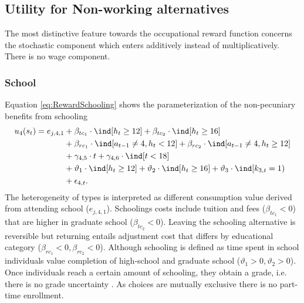 \FloatBarrier\subsection{Utility for Non-working alternatives}
The most distinctive feature towards the occupational reward function concerns the stochastic component which enters additively instead of multiplicatively. There is no wage component.
\FloatBarrier\subsubsection{School}
Equation \ref{eq:RewardSchooling} shows the parameterization of the non-pecuniary benefits from schooling
%
\begin{align}\label{eq:RewardSchooling}
	u_{4}(s_t) = e_{j, 4, 1} & + \beta_{tc_1} \cdot \ind[h_t \geq 12] + \beta_{tc_2} \cdot \ind[h_t \geq 16] 														\nonumber \\
    							  & + \beta_{rc_1} \cdot \ind[a_{t-1} \neq 4, h_t < 12] + \beta_{rc_2} \cdot \ind[a_{t-1} \neq 4, h_t \geq 12] 			   \nonumber \\
    							  & + \gamma_{4,5} \cdot t + \gamma_{4,6} \cdot \ind[t < 18] 																					  \nonumber \\
     							  & + \vartheta_1 \cdot \ind[h_t \geq 12] + \vartheta_2 \cdot \ind[h_t \geq 16] + \vartheta_3 \cdot \ind[k_{3,t} = 1) \nonumber \\
      							  & + \epsilon_{4,t}.
\end{align}
%
The heterogeneity of types is interpreted as different consumption value derived from attending school ($e_{j,4,1}$). Schoolings costs include tuition and fees ($\beta_{tc_1} < 0$) that are higher in graduate school ($\beta_{tc_2} < 0$). Leaving the schooling alternative is reversible but returning entails adjustment cost that differs by educational category ($\beta_{rc_1} <0, \beta_{rc_2} < 0$). Although schooling is defined as time spent in school individuals value completion of high-school and graduate school ($\vartheta_1 > 0, \vartheta_2 > 0$). Once individuals reach a certain amount of schooling, they obtain a grade, i.e. there is no grade uncertainty \citep{Altonji.1993}. As choices are mutually exclusive there is no part-time enrollment. 

